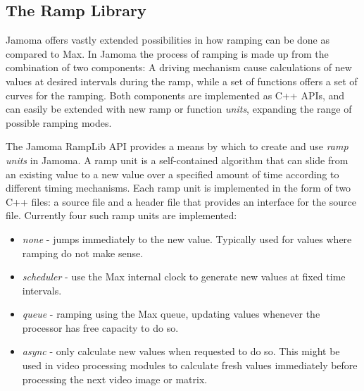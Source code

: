 \documentclass{article}
\begin{document}
\subsection{The Ramp Library} %
\label{sec:ramplib}


Jamoma offers vastly extended possibilities in how ramping can be done as compared to Max. In Jamoma the process of ramping is made up from the combination of two components: A driving mechanism cause calculations of new values at desired intervals during the ramp, while a set of functions offers a set of curves for the ramping. Both components are implemented as C++ APIs, and can easily be extended with new ramp or function \emph{units}, expanding the range of possible ramping modes. %

The Jamoma RampLib API provides a means by which to create and use \emph{ramp units} in Jamoma.  A ramp unit is a self-contained algorithm that can slide from an existing value to a new value over a specified amount of time according to different timing mechanisms. Each ramp unit is implemented in the form of two C++ files: a source file and a header file that provides an interface for the source file. Currently four such ramp units are implemented:

\begin{itemize}
	\item \emph{none} - jumps immediately to the new value. Typically used for values where ramping do not make sense.
	\item \emph{scheduler} - use the Max internal clock to generate new values at fixed time intervals.
	\item \emph{queue} - ramping using the Max queue, updating values whenever the processor has free capacity to do so.
	\item \emph{async} - only calculate new values when requested to do so. This might be used in video processing modules to calculate fresh values immediately before processing the next video image or matrix.
\end{itemize}
\end{document}
